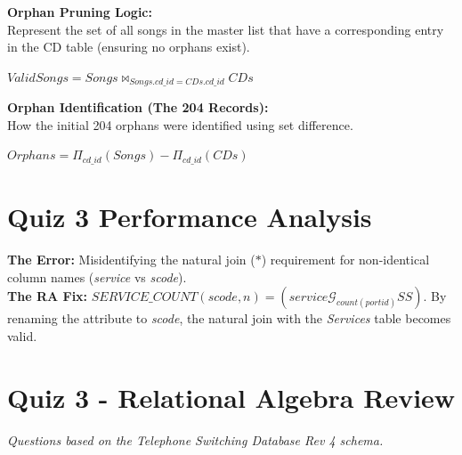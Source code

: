 \documentclass[12pt, answers]{exam}
\begin{document}
\begin{questions}
    \setcounter{question}{10}
    \question \textbf{Orphan Pruning Logic:} \\
    Represent the set of all songs in the master list that have a corresponding entry in the CD table (ensuring no orphans exist).
    \begin{solution}
    $ValidSongs = Songs \bowtie_{Songs.cd\_id = CDs.cd\_id} CDs$
    \end{solution}

    \question \textbf{Orphan Identification (The 204 Records):} \\
    How the initial 204 orphans were identified using set difference.
    \begin{solution}
    $Orphans = \Pi_{cd\_id}(Songs) - \Pi_{cd\_id}(CDs)$
    \end{solution}
\end{questions}

\section{Quiz 3 Performance Analysis}
\begin{tcolorbox}[colback=red!5, colframe=red!75!black, title=Correction for Question 2]
\textbf{The Error:} Misidentifying the natural join ($\ast$) requirement for non-identical column names (\textit{service} vs \textit{scode}). \\
\textbf{The RA Fix:} $SERVICE\_COUNT(scode, n) = (service \mathcal{G}_{count(portid)} SS)$. By renaming the attribute to \textit{scode}, the natural join with the \textit{Services} table becomes valid.
\end{tcolorbox}

\section{Quiz 3 - Relational Algebra Review}
\textit{Questions based on the Telephone Switching Database Rev 4 schema.}
\end{document}
